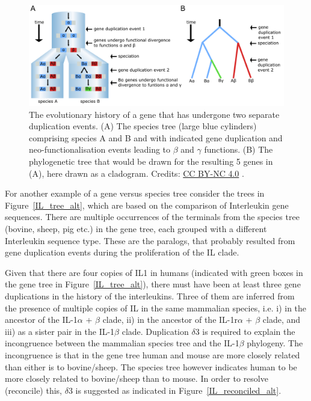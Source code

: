 \begin{figure}[!htbp]
\centering
\includegraphics[width=1\linewidth]{files/gene-duplication-spe-54222efe84d06eec938ca9305ffe33d6.pdf}
\caption[]{The evolutionary history of a gene that has undergone two separate duplication events.
(A) The species tree (large blue cylinders) comprising species A and B and with indicated gene duplication and neo-functionalisation events leading to $\beta$ and $\gamma$ functions.
(B) The phylogenetic tree that would be drawn for the resulting 5 genes in (A), here drawn as a cladogram.
Credits: \href{https://creativecommons.org/licenses/by-nc/4.0/}{CC BY-NC 4.0} \cite{own_3_2024}.}
\label{gene_duplication_speciation_alt}
\end{figure}

For another example of a gene versus species tree consider the trees in Figure~\ref{IL_tree_alt}, which are based on the comparison of Interleukin gene sequences.
There are multiple occurrences of the terminals from the species tree (bovine, sheep, pig etc.) in the gene tree, each grouped with a different Interleukin sequence type.
These are the paralogs, that probably resulted from gene duplication events during the proliferation of the IL clade.

Given that there are four copies of IL1 in humans (indicated with green boxes in the gene tree in Figure~\ref{IL_tree_alt}), there must have been at least three gene duplications in the history of the interleukins.
Three of them are inferred from the presence of multiple copies of IL in the same mammalian species, i.e. i) in the ancestor of the IL-1$\alpha$ + $\beta$ clade, ii) in the ancestor of the IL-1r$\alpha$ + $\beta$ clade, and iii) as a sister pair in the IL-1$\beta$ clade.
Duplication $\delta$3 is required to explain the incongruence between the mammalian species tree and the IL-1$\beta$ phylogeny.
The incongruence is that in the gene tree human and mouse are more closely related than either is to bovine/sheep.
The species tree however indicates human to be more closely related to bovine/sheep than to mouse.
In order to resolve (reconcile) this, $\delta$3 is suggested as indicated in Figure~\ref{IL_reconciled_alt}.

